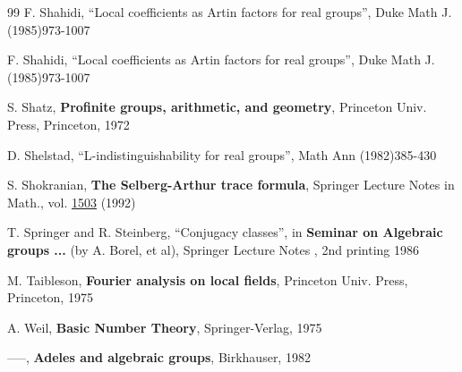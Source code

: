 \begin{thebibliography}{99}
F. Shahidi, ``Local coefficients as Artin factors
for real groups'',
Duke Math J. (1985)973-1007

 F. Shahidi, ``Local coefficients as Artin factors
for real groups'',
Duke Math J. (1985)973-1007


 S. Shatz, {\bf Profinite groups, arithmetic, and
geometry},
Princeton Univ. Press, Princeton, 1972

 D. Shelstad, ``L-indistinguishability for real groups'',
Math
Ann (1982)385-430

 S. Shokranian, {\bf The Selberg-Arthur trace formula},
Springer Lecture Notes in Math., vol. \underline{1503} (1992)


 T. Springer and R. Steinberg, ``Conjugacy classes'',
in {\bf Seminar on Algebraic groups ...} (by A. Borel, et al),
Springer Lecture Notes , 2nd printing 1986

 M. Taibleson, {\bf Fourier analysis on local fields}, 
Princeton Univ.
Press, Princeton, 1975


 A. Weil, {\bf Basic Number Theory},
Springer-Verlag, 1975

 -----, {\bf Adeles and algebraic groups}, 
Birkhauser, 1982


\end{thebibliography}


